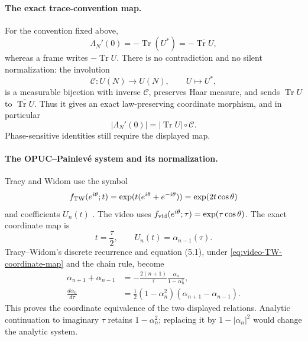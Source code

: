 \paragraph{The exact trace-convention map.}
For the convention fixed above,
\begin{equation}
 \Lambda_N'(0)=-\operatorname{Tr}(U^*)
              =-\overline{\operatorname{Tr}U},
 \label{eq:video-trace-convention}
\end{equation}
whereas a frame writes $-\operatorname{Tr}U$.  There is no contradiction and no silent
normalization: the involution
\[
 \mathcal C:U(N)\longrightarrow U(N),\qquad U\longmapsto U^*,
\]
is a measurable bijection with inverse $\mathcal C$, preserves Haar measure, and sends
$\operatorname{Tr}U$ to $\overline{\operatorname{Tr}U}$.  Thus it gives an exact
law-preserving coordinate morphism, and in particular
\[
 |\Lambda_N'(0)|=|\operatorname{Tr}U|\circ\mathcal C.
\]
Phase-sensitive identities still require the displayed map.

\paragraph{The OPUC--Painlev\'e system and its normalization.}
Tracy and Widom use the symbol
\[
 f_{\rm TW}(e^{i\theta};t)=\exp(t(e^{i\theta}+e^{-i\theta}))
                           =\exp(2t\cos\theta)
\]
and coefficients $U_n(t)$ \cite[Secs.~I and V]{tracyWidom1999}.  The video uses
$f_{\rm vid}(e^{i\theta};\tau)=\exp(\tau\cos\theta)$.  The exact coordinate map is
\begin{equation}
 t=\frac{\tau}{2},\qquad U_n(t)=\alpha_{n-1}(\tau).
 \label{eq:video-TW-coordinate-map}
\end{equation}
Tracy--Widom's discrete recurrence and equation (5.1), under
\eqref{eq:video-TW-coordinate-map} and the chain rule, become
\begin{align}
 \alpha_{n+1}+\alpha_{n-1}
 &=-\frac{2(n+1)}{\tau}\frac{\alpha_n}{1-\alpha_n^2},
 \label{eq:video-dPII}\\
 \frac{d\alpha_n}{d\tau}
 &=\frac12(1-\alpha_n^2)(\alpha_{n+1}-\alpha_{n-1}).
 \label{eq:video-alpha-flow}
\end{align}
This proves the coordinate equivalence of the two displayed relations.  Analytic
continuation to imaginary $\tau$ retains $1-\alpha_n^2$; replacing it by
$1-|\alpha_n|^2$ would change the analytic system.

